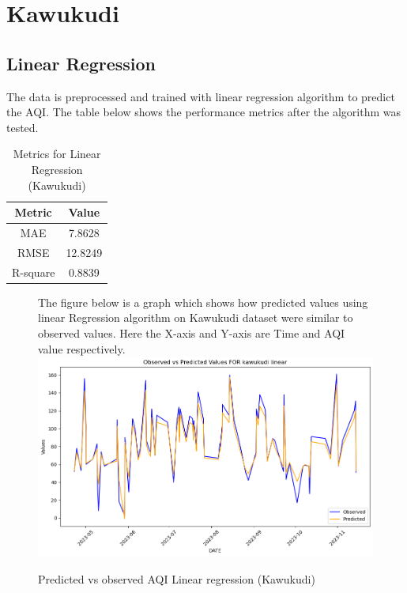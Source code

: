 \documentclass{book}
\numberwithin{equation}{section}
\numberwithin{figure}{section}
\begin{document}
\vspace{-5mm} %
\section{Kawukudi}
\label{kawukudi}
\vspace{-5mm} %
\subsection{Linear Regression}
\vspace{-5mm} %
The data is preprocessed and trained with linear regression algorithm to predict the AQI. The table below shows the performance metrics after the algorithm was tested.\\
\begin{table}[H]
    \centering
    \begin{tabular}{|c|c|}
        \hline
        \textbf{Metric} & \textbf{Value} \\
        \hline
        MAE & 7.8628 \\
        \hline
        RMSE & 12.8249 \\
        \hline
        R-square & 0.8839 \\
        \hline
    \end{tabular}
    \caption{Metrics for Linear Regression (Kawukudi)}
    \label{tab: Linear metrics(Kawukudi)}
\end{table}
\begin{figure}[H]
 \begin{minipage}{\linewidth}
        The figure below is a graph which shows how predicted values using linear Regression algorithm on Kawukudi dataset were similar to observed values. Here the X-axis and Y-axis are Time and AQI value respectively.
        \vspace{0.5em} 
        \includegraphics[width=\linewidth]{kawukudi linear.png}
       
        \caption{ Predicted vs observed AQI Linear regression (Kawukudi)}
        \label{fig: Linear predicted vs observed AQI(Kawukudi)}
    \end{minipage}
\end{figure}
\end{document}
